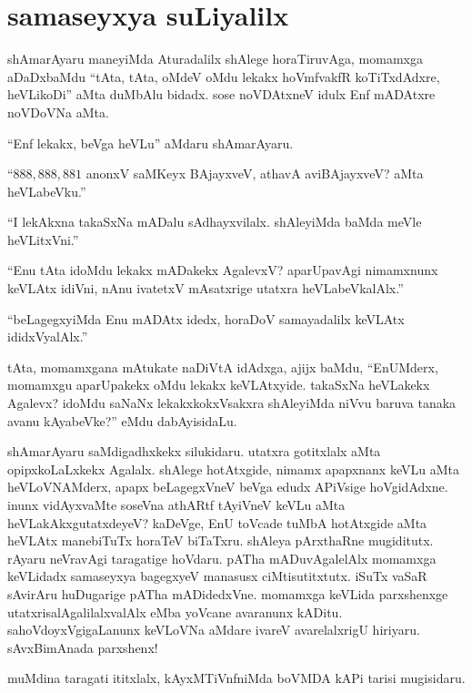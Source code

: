 \chapter{samaseyxya suLiyalilx}\label{chap16}

\qquad shAmarAyaru maneyiMda Aturadalilx shAlege horaTiruvAga, momamxga aDaDxbaMdu ``tAta, tAta, oMdeV oMdu lekakx hoVmfvakfR koTiTxdAdxre, heVLikoDi'' aMta duMbAlu bidadx. sose noVDAtxneV idulx Enf mADAtxre noVDoVNa aMta.

\vskip 0.1cm

``Enf lekakx, beVga heVLu'' aMdaru shAmarAyaru.

\vskip 0.1cm

``$888,888,881$ anonxV saMKeyx BAjayxveV, athavA aviBAjayxveV? aMta heVLabeVku.''

\vskip 0.1cm

``I lekAkxna takaSxNa mADalu sAdhayxvilalx. shAleyiMda baMda meVle heVLitxVni.''

\vskip 0.1cm

``Enu tAta idoMdu lekakx mADakekx AgalevxV? aparUpavAgi nimamxnunx keVLAtx idiVni, nAnu ivatetxV mAsatxrige utatxra heVLabeVkalAlx.''

\vskip 0.1cm

``beLagegxyiMda Enu mADAtx idedx, horaDoV samayadalilx keVLAtx ididxVyalAlx.''

\vskip 0.1cm

tAta, momamxgana mAtukate naDiVtA idAdxga, ajijx baMdu, ``EnUMderx, momamxgu aparUpakekx oMdu lekakx keVLAtxyide. takaSxNa heVLakekx Agalevx? idoMdu saNaNx lekakxkokxVsakxra shAleyiMda niVvu baruva tanaka avanu kAyabeVke?'' eMdu dabAyisidaLu.


shAmarAyaru saMdigadhxkekx silukidaru. utatxra gotitxlalx aMta opipxkoLaLxkekx Agalalx. shAlege hotAtxgide, nimamx apapxnanx keVLu aMta heVLoVNAMderx, apapx beLagegxVneV beVga edudx APiVsige hoVgidAdxne. inunx vidAyxvaMte soseVna athARtf tAyiVneV keVLu aMta heVLakAkxgutatxdeyeV? kaDeVge, EnU toVcade tuMbA hotAtxgide aMta heVLAtx manebiTuTx horaTeV biTaTxru. shAleya pArxthaRne mugiditutx. rAyaru neVravAgi taragatige hoVdaru. pATha mADuvAgalelAlx momamxga keVLidadx samaseyxya bagegxyeV manasusx ciMtisutitxtutx. iSuTx vaSaR sAvirAru huDugarige pATha mADidedxVne. momamxga keVLida parxshenxge utatxrisalAgalilalxvalAlx eMba yoVcane avaranunx kADitu. sahoVdoyxVgigaLanunx keVLoVNa aMdare ivareV avarelalxrigU hiriyaru. sAvxBimAnada parxshenx!

\vskip 0.15cm

muMdina taragati ititxlalx, kAyxMTiVnfniMda boVMDA kAPi tarisi mugisidaru. 

